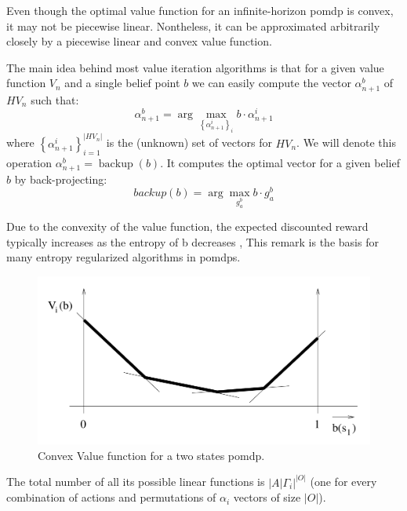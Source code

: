 \begin{remark}
    Even though the optimal value function for an infinite-horizon
    \gls{pomdp} is convex, it may not be piecewise linear. Nontheless, it can be approximated
    arbitrarily closely by a piecewise linear and convex value function.
\end{remark}


The main idea behind most value iteration algorithms is that for a given value function 
\(V_{n}\) and a single belief point \(b\) we can
easily compute the vector \(\alpha_{n+1}^{b}\) of \(H V_{n}\) such that:
$$\alpha_{n+1}^{b}=\arg \max _{\left\{\alpha_{n+1}^{i}\right\}_{i}} b \cdot \alpha_{n+1}^{i}$$    
where \(\left\{\alpha_{n+1}^{i}\right\}_{i=1}^{|H V_{n}|}\) is the (unknown) set of vectors for \(H V_{n}\). 
We will denote this operation
\(\alpha_{n+1}^{b}=\operatorname{backup}(b)\). 
It computes the optimal vector for a given belief \(b\) by back-projecting:
\begin{equation}
    {backup}(b)=\arg\max_{g_a^b} b\cdot g_a^b
    \label{eq:backup}
\end{equation}
        

Due to the convexity of the value function, the expected discounted reward typically increases 
as the entropy of b decreases , This remark is the basis for 
many entropy regularized algorithms in \gls{pomdp}s.

\begin{figure}
    \centering
    \includegraphics[scale=0.2]{images/pomdp-value.png}
    \caption{Convex Value function for a two states \gls{pomdp}.}
    \label{fig:pomdp-value}
\end{figure}


The total number of all its possible linear functions is $|A|\Gamma_i|^{|O|}$ (one
for every combination of actions and permutations of $\alpha_i$ vectors of size $|O|$). 

